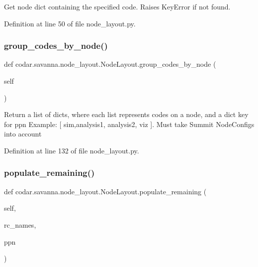 \begin{DoxyVerb}Get node dict containing the specified code. Raises KeyError if
not found.\end{DoxyVerb}
 

Definition at line 50 of file node\+\_\+layout.\+py.

\mbox{\label{classcodar_1_1savanna_1_1node__layout_1_1_node_layout_a3f6f326ba64b563322c2b745775ab82b}} 
\subsubsection{\texorpdfstring{group\+\_\+codes\+\_\+by\+\_\+node()}{group\_codes\_by\_node()}}
{\footnotesize\ttfamily def codar.\+savanna.\+node\+\_\+layout.\+Node\+Layout.\+group\+\_\+codes\+\_\+by\+\_\+node (\begin{DoxyParamCaption}\item[{}]{self }\end{DoxyParamCaption})}

\begin{DoxyVerb}Return a list of dicts, where each list represents codes on a
node, and a dict key for ppn
Example: [ {sim,analysis1}, {analysis2}, {viz} ].
Must take Summit NodeConfigs into account\end{DoxyVerb}
 

Definition at line 132 of file node\+\_\+layout.\+py.

\mbox{\label{classcodar_1_1savanna_1_1node__layout_1_1_node_layout_addd066236434ca6fb9813fc50bcac973}} 
\subsubsection{\texorpdfstring{populate\+\_\+remaining()}{populate\_remaining()}}
{\footnotesize\ttfamily def codar.\+savanna.\+node\+\_\+layout.\+Node\+Layout.\+populate\+\_\+remaining (\begin{DoxyParamCaption}\item[{}]{self,  }\item[{}]{rc\+\_\+names,  }\item[{}]{ppn }\end{DoxyParamCaption})}



